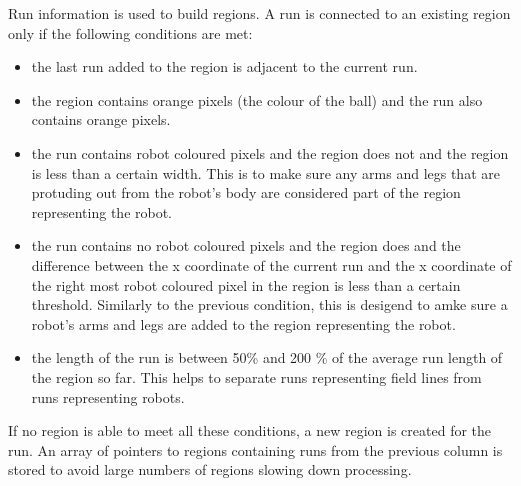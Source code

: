 \documentclass[runningheads,a4paper]{llncs}
\begin{document}
Run information is used to build regions. A run is connected to an existing region only if the following conditions are met: 
\begin{itemize}
\item{the last run added to the region is adjacent to the current run.}
\item{the region contains orange pixels (the colour of the ball) and the run also contains orange
pixels.}
\item{the run contains robot coloured pixels and the region does not and the
region is less than a certain width. This is to make sure any arms and legs that are protuding out from the robot's body are considered part of the region representing the robot.}
\item{the run contains no robot coloured pixels and the region does and the
difference between the x coordinate of the current run and the x coordinate of
the right most robot coloured pixel in the region is less than a certain
threshold. Similarly to the previous condition, this is desigend to amke sure a robot's arms and legs are added to the region representing the robot.}
\item{the length of the run is between 50\% and 200 \% of the average run length
of the region so far. This helps to separate runs representing field lines from runs representing robots.}
\end{itemize}

If no region is able to meet all these conditions, a new region is created for
the run. An array of pointers to regions containing runs from the previous
column is stored to avoid large numbers of regions slowing down processing. 


\end{document}

